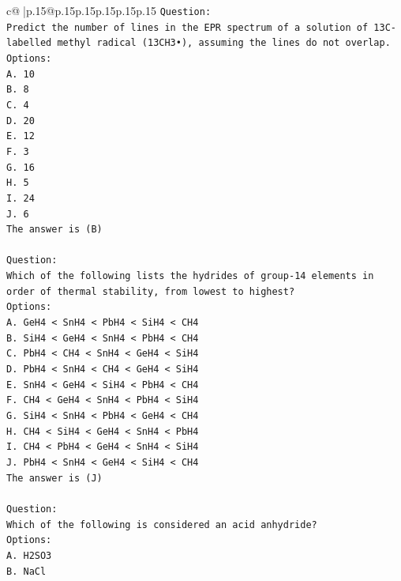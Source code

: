 \documentclass{article}
\begin{document}
{\begin{supertabular}{c@{$\;$}|p{.15\linewidth}@{}p{.15\linewidth}p{.15\linewidth}p{.15\linewidth}p{.15\linewidth}p{.15\linewidth}}
{{{\texttt{Question:} \\
\texttt{Predict the number of lines in the EPR spectrum of a solution of 13C{-}labelled methyl radical (13CH3•), assuming the lines do not overlap.} \\
\texttt{Options:} \\
\texttt{A. 10} \\
\texttt{B. 8} \\
\texttt{C. 4} \\
\texttt{D. 20} \\
\texttt{E. 12} \\
\texttt{F. 3} \\
\texttt{G. 16} \\
\texttt{H. 5} \\
\texttt{I. 24} \\
\texttt{J. 6} \\
\texttt{The answer is (B)} \\
\\ 
\texttt{Question:} \\
\texttt{Which of the following lists the hydrides of group{-}14 elements in order of thermal stability, from lowest to highest?} \\
\texttt{Options:} \\
\texttt{A. GeH4 < SnH4 < PbH4 < SiH4 < CH4} \\
\texttt{B. SiH4 < GeH4 < SnH4 < PbH4 < CH4} \\
\texttt{C. PbH4 < CH4 < SnH4 < GeH4 < SiH4} \\
\texttt{D. PbH4 < SnH4 < CH4 < GeH4 < SiH4} \\
\texttt{E. SnH4 < GeH4 < SiH4 < PbH4 < CH4} \\
\texttt{F. CH4 < GeH4 < SnH4 < PbH4 < SiH4} \\
\texttt{G. SiH4 < SnH4 < PbH4 < GeH4 < CH4} \\
\texttt{H. CH4 < SiH4 < GeH4 < SnH4 < PbH4} \\
\texttt{I. CH4 < PbH4 < GeH4 < SnH4 < SiH4} \\
\texttt{J. PbH4 < SnH4 < GeH4 < SiH4 < CH4} \\
\texttt{The answer is (J)} \\
\\ 
\texttt{Question:} \\
\texttt{Which of the following is considered an acid anhydride?} \\
\texttt{Options:} \\
\texttt{A. H2SO3} \\
\texttt{B. NaCl} \\
}}}
\end{supertabular}}
\end{document}
